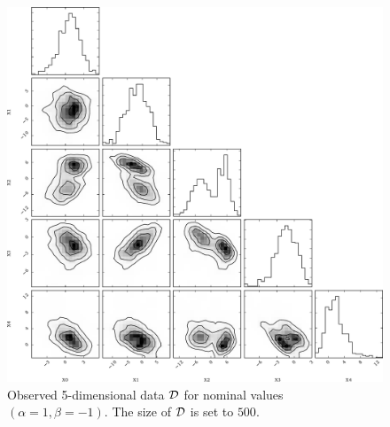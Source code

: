 \documentclass[12pt]{article}
\numberwithin{equation}{section}
\theoremstyle{plain}
\begin{document}
\begin{figure}
    \centering
    \includegraphics[width=1.0\textwidth]{figures/fig4.pdf}
    \caption{Observed 5-dimensional data ${\cal D}$ for nominal values $(\alpha=1, \beta=-1)$. The size of ${\cal D}$ is set to $500$.}
    \label{fig:4}
\end{figure}
\end{document}
